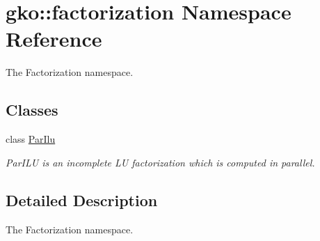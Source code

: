 \hypertarget{namespacegko_1_1factorization}{}\section{gko\+:\+:factorization Namespace Reference}
\label{namespacegko_1_1factorization}


The Factorization namespace.  


\subsection*{Classes}
\begin{DoxyCompactItemize}
\item 
class \hyperlink{classgko_1_1factorization_1_1ParIlu}{Par\+Ilu}
\begin{DoxyCompactList}\small\item\em Par\+I\+LU is an incomplete LU factorization which is computed in parallel. \end{DoxyCompactList}\end{DoxyCompactItemize}


\subsection{Detailed Description}
The Factorization namespace. 